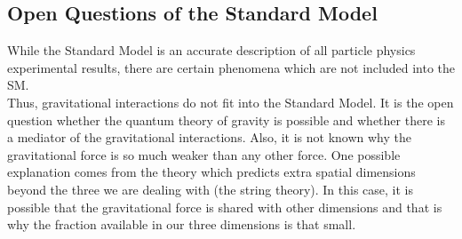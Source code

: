 \subsection{Open Questions of the Standard Model}


While the Standard Model is an accurate description of all particle physics experimental results, there are certain phenomena which are not included into the SM. \\

Thus, gravitational interactions do not fit into the Standard Model. It is the open question whether the quantum theory of gravity is possible and whether there is a mediator of the gravitational interactions. Also, it is not known why the gravitational force is so much weaker than any other force. One possible explanation comes from the theory which predicts extra spatial dimensions beyond the three we are dealing with (the string theory). In this case, it is possible that the gravitational force is shared with other dimensions and that is why the fraction available in our three dimensions is that small.\\

